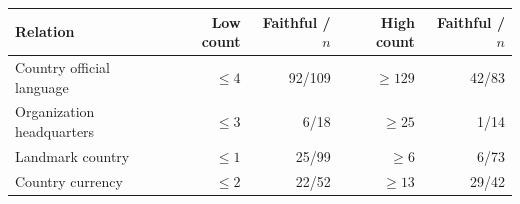 \begin{tabular}{lrrrr}
\toprule
Relation & Low count & Faithful / $n$ & High count & Faithful / $n$ \\
\midrule
Country official language & $\leq 4$ & 92/109 & $\geq 129$ & 42/83 \\
Organization headquarters & $\leq 3$ & 6/18 & $\geq 25$ & 1/14 \\
Landmark country & $\leq 1$ & 25/99 & $\geq 6$ & 6/73 \\
Country currency & $\leq 2$ & 22/52 & $\geq 13$ & 29/42 \\
\bottomrule
\end{tabular}
